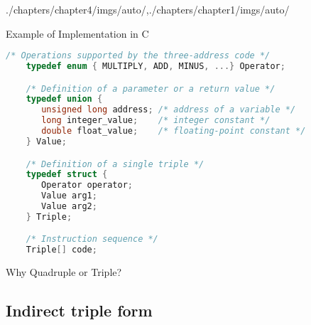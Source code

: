 \begin{graphicspathcontext}{{./chapters/chapter4/imgs/auto/},{./chapters/chapter1/imgs/auto/}}
\begin{bibunit}[apalike]
\begin{frame}[background=6,fragile]{Example of Implementation in C}
	\begin{lstlisting}[language=C,basicstyle=\scriptsize]
	/* Operations supported by the three-address code */
	typedef enum { MULTIPLY, ADD, MINUS, ...} Operator;

	/* Definition of a parameter or a return value */
	typedef union { 
	   unsigned long address; /* address of a variable */
	   long integer_value;    /* integer constant */
	   double float_value;    /* floating-point constant */
	} Value;

	/* Definition of a single triple */
	typedef struct {
	   Operator operator;
	   Value arg1;
	   Value arg2;
	} Triple;

	/* Instruction sequence */
	Triple[] code;
	\end{lstlisting}
\end{frame}

\begin{frame}{Why Quadruple or Triple?}
	\vspace{.25cm}
	\vspace{.25cm}
\end{frame}

\subsection{Indirect triple form}
\subsectiontableofcontentslide


\end{bibunit}
\end{graphicspathcontext}
